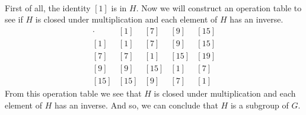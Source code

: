 \documentclass[11pt,a4paper]{article}
\begin{document}
~\\
First of all, the identity $[1]$ is in $H$. Now we will construct an operation table to see if $H$ is closed under multiplication and each element of $H$ has an inverse.
\[
\begin{array}{c|c|c|c|c}
\cdot & [1] & [7] & [9] & [15] \\\hline
[1] & [1] & [7] & [9] & [15]\\ \hline
[7] & [7] & [1] & [15] & [19] \\ \hline
[9] & [9] & [15] & [1] & [7] \\ \hline
[15] & [15] & [9] & [7] & [1]
\end{array} 
\]
From this operation table we see that $H$ is closed under multiplication and each element of $H$ has an inverse. And so, we can conclude that $H$ is a subgroup of $G$.\\
\end{document}
